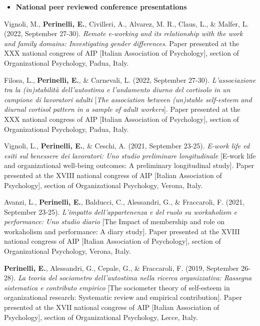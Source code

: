 \documentclass[hidelinks, letterpaper,10pt]{article} %
\begin{document}
\begin{itemize} 
	\setlength{\topsep}{0pt}%
	\setlength{\leftmargin}{0.1in}%
	\setlength{\listparindent}{-0.1in}%
	\setlength{\itemindent}{-0.2in}%
	\setlength{\parsep}{\parskip}%
	
	\item {\textbf{\large{National peer reviewed conference presentations}}}
\end{itemize}
\begin{etaremune}
	
	\item Vignoli, M., \textbf{Perinelli, E.}, Civilleri, A., Alvarez, M. R., Claus, L., \& Malfer, L. (2022, September 27-30). \textit{Remote e-working and its relationship with the work and family domains: Investigating gender differences}. Paper presented at the XXX national congress of AIP [Italian Association of Psychology], section of Organizational Psychology, Padua, Italy.

	\item Filosa, L., \textbf{Perinelli, E.}, \& Carnevali, L. (2022, September 27-30). \textit{L'associazione tra la (in)stabilità dell'autostima e l'andamento diurno del cortisolo in un campione di lavoratori adulti} [\textit{The association between (un)stable self-esteem and diurnal cortisol pattern in a sample of adult workers}]. Paper presented at the XXX national congress of AIP [Italian Association of Psychology], section of Organizational Psychology, Padua, Italy.
	
	\item Vignoli, L., \textbf{Perinelli, E.}, \& Ceschi, A. (2021, September 23-25). \textit{E-work life ed esiti sul benessere dei lavoratori: Uno studio preliminare longitudinale} [E-work life and organizational well-being outcomes: A preliminary longitudinal study]. Paper presented at the XVIII national congress of AIP [Italian Association of Psychology], section of Organizational Psychology, Verona, Italy.

    \item Avanzi, L., \textbf{Perinelli, E.}, Balducci, C., Alessandri, G., \& Fraccaroli, F. (2021, September 23-25). \textit{L’impatto dell'appartenenza e del ruolo su workaholism e performance: Uno studio diario} [The Impact of membership and role on workaholism and performance: A diary study]. Paper presented at the XVIII national congress of AIP [Italian Association of Psychology], section of Organizational Psychology, Verona, Italy.

    \item \textbf{Perinelli, E.}, Alessandri, G., Cepale, G., \& Fraccaroli, F. (2019, September 26-28). \textit{La teoria del sociometro dell’autostima nella ricerca organizzativa: Rassegna sistematica e contributo empirico} [The sociometer theory of self-esteem in organizational research: Systematic review and empirical contribution]. Paper presented at the XVII national congress of AIP [Italian Association of Psychology], section of Organizational Psychology, Lecce, Italy.


\end{etaremune}
\end{document}
